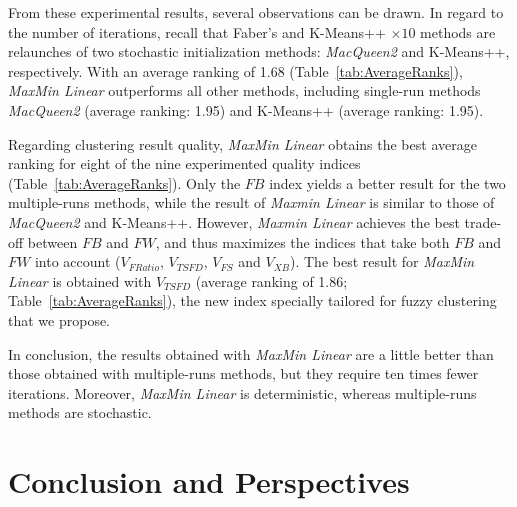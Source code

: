 \documentclass[runningheads,a4paper]{llncs}
\begin{document}


From these experimental results, several observations can be drawn. In regard to the number of iterations, recall that Faber's and K-Means++ $\times 10$ methods are relaunches of two stochastic initialization methods: \textit{MacQueen2} and K-Means++, respectively. With an average ranking of 1.68 (Table~\ref{tab:AverageRanks}),  \textit{MaxMin Linear} outperforms all other methods, including single-run methods \textit{MacQueen2} (average ranking: 1.95) and K-Means++ (average ranking: 1.95).

Regarding clustering result quality, \textit{MaxMin Linear} obtains the best average ranking for eight of the nine experimented quality indices  (Table~\ref{tab:AverageRanks}). Only the $FB$ index yields a better result for the two multiple-runs methods, while the result of \textit{Maxmin Linear} is similar to those of \textit{MacQueen2} and K-Means++. However, \textit{Maxmin Linear} achieves the best trade-off between $FB$ and $FW$, and thus maximizes the indices that take  both $FB$ and $FW$ into account ($V_{FRatio}$, $V_{TSFD}$, $V_{FS}$ and $V_{XB}$). The best result for \textit{MaxMin Linear} is obtained with $V_{TSFD}$ (average ranking of 1.86; Table~\ref{tab:AverageRanks}), the new index specially tailored for fuzzy clustering that we propose.

In conclusion, the results obtained with \textit{MaxMin Linear} are a little better than those obtained with multiple-runs methods, but they require ten times fewer iterations. Moreover, \textit{MaxMin Linear} is deterministic, whereas  multiple-runs methods are stochastic.

\section{Conclusion and Perspectives}
\label{sec:Conclusion}
\end{document}
